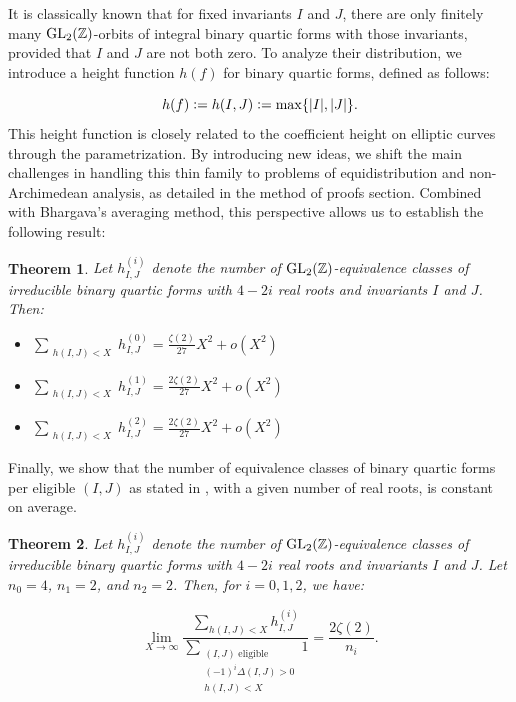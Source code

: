 \documentclass{article}
\def\Z{{\mathbb Z}}
\def\GL{{\rm GL}}
\def\Z{{\mathbb Z}}
\newtheorem{theorem}{Theorem}[section]
\begin{document}
It is classically known that for fixed invariants $I$ and $J$, there are only finitely many $\GL_2(\Z)$-orbits of integral binary quartic forms with those invariants, provided that $I$ and $J$ are not both zero. To analyze their distribution, we introduce a height function $h(f)$ for binary quartic forms, defined as follows:

\begin{equation*}
    h(f) \vcentcolon= h(I, J) \vcentcolon= \max\{|I|, |J|\}.
\end{equation*}
This height function is closely related to the coefficient height on elliptic curves through the parametrization. By introducing new ideas, we shift the main challenges in handling this thin family to problems of equidistribution and non-Archimedean analysis, as detailed in the method of proofs section. Combined with Bhargava’s averaging method, this perspective allows us to establish the following result:

\begin{theorem}\label{binary quartic average}
    Let $h^{(i)}_{I,J}$ denote the number of $\GL_2(\Z)$-equivalence classes of irreducible binary quartic forms with $4 - 2i$ real roots and invariants $I$ and $J$. Then:
    \begin{itemize}  
        \item [\textnormal{(a)}] $\displaystyle\sum_{\substack{h(I,J) < X}} h^{(0)}_{I,J} = \frac{\zeta(2)}{27}X^{2} + o(X^2)$
        \item [\textnormal{(b)}] $\displaystyle\sum_{\substack{h(I,J) < X}} h^{(1)}_{I,J} = \frac{2\zeta(2)}{27}X^{2} + o(X^2)$
        \item [\textnormal{(c)}] $\displaystyle\sum_{\substack{h(I,J) < X}} h^{(2)}_{I,J} = \frac{2\zeta(2)}{27}X^{2} + o(X^2)$
\end{itemize} 
\end{theorem} 

Finally, we show that the number of equivalence classes of binary quartic forms per eligible $(I, J)$ as stated in \cite{main}, with a given number of real roots, is constant on average.
\begin{theorem}
    Let $h^{(i)}_{I,J}$ denote the number of $\GL_2(\Z)$-equivalence classes of irreducible binary quartic forms with $4 - 2i$ real roots and invariants $I$ and $J$. Let $n_0 = 4$, $n_1 = 2$, and $n_2 = 2$. Then, for $i = 0, 1, 2$, we have:

    \begin{equation*}
        \lim_{X \to \infty} \frac{\displaystyle\sum_{h(I,J) < X} h^{(i)}_{I,J}}{\displaystyle\sum_{\substack{(I,J) \;\mathrm{eligible}\\ (-1)^i \Delta(I,J) > 0 \\ h(I,J) < X }} 1} = \frac{2\zeta(2)}{n_i}.
\end{equation*}
\end{theorem}
\end{document}
